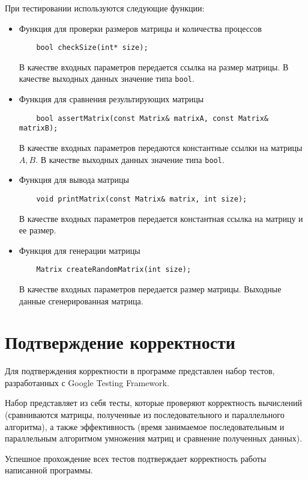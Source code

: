 \documentclass{report}
\begin{document}
\par При тестировании используются следующие функции:
\begin{itemize}
    \item Функция для проверки размеров матрицы и количества процессов
    \begin{lstlisting}
    bool checkSize(int* size);
    \end{lstlisting}
    \par В качестве входных параметров передается ссылка на размер матрицы. В качестве выходных данных значение типа \verb|bool|.
    \item Функция для сравнения результирующих матрицы
    \begin{lstlisting}
    bool assertMatrix(const Matrix& matrixA, const Matrix& matrixB);
    \end{lstlisting}
    \par В качестве входных параметров передаются константные ссылки на матрицы {\itshape $A, B$}. В качестве выходных данных значение типа \verb|bool|.
    \item Функция для вывода матрицы
    \begin{lstlisting}
    void printMatrix(const Matrix& matrix, int size);
    \end{lstlisting}
    \par В качестве входных параметров передается константная ссылка на матрицу и ее размер.
    \item Функция для генерации матрицы
    \begin{lstlisting}
    Matrix createRandomMatrix(int size);
    \end{lstlisting}
    \par В качестве входных параметров передается размер матрицы. Выходные данные сгенерированная матрица.
\end{itemize}
\newpage

\section*{Подтверждение корректности}
Для подтверждения корректности в программе представлен набор тестов, разработанных с Google Testing Framework.
\par Набор представляет из себя тесты, которые проверяют корректность вычислений (сравниваются матрицы, полученные из последовательного и параллельного алгоритма), а также эффективность (время занимаемое последовательным и параллельным алгоритмом умножения матриц и сравнение полученных данных).
\par Успешное прохождение всех тестов подтверждает корректность работы написанной программы.
\newpage
\end{document}
